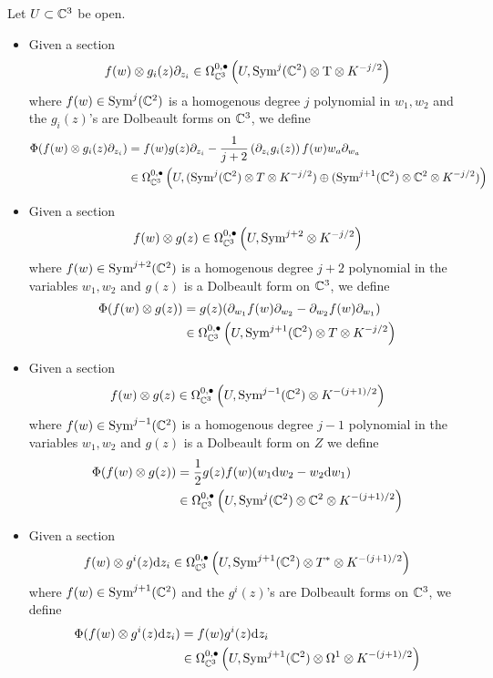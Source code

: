 Let $U\subset \mathbb{C}^3$ be open. 
\begin{itemize}
\item Given a section
\[
f(w) \otimes g_i(z) \partial_{z_i}\in \Omega^{0,\bullet}_{\mathbb{C}^3} \left (U, \text{Sym}^j(\mathbb{C}^2) \otimes {\mathrm{T}} \otimes K^{-j/2} \right )
\] where $f(w) \in \text{Sym}^j (\mathbb{C}^2)$ is a homogenous degree $j$ polynomial in $w_1,w_2$ and the $g_i(z)$'s are Dolbeault forms on $\mathbb{C}^3$, we define
\begin{align*}
\Phi(f(w) \otimes g_i(z) \partial_{z_i}) &= f(w) g(z) \partial_{z_i} - \frac{1}{j+2} \left(\partial_{z_i} g_i(z)\right) f(w) w_a\partial_{w_a} \\
&\in \Omega^{0,\bullet}_{\mathbb{C}^3} \left ( U, (\text{Sym}^j (\mathbb{C}^2) \otimes T\otimes K^{-j/2} )\oplus ( \text{Sym}^{j+1}(\mathbb{C}^2) \otimes \mathbb{C}^2 \otimes K^{-j/2} ) \right )
\end{align*}

\item Given a section
\[
f(w) \otimes g(z)\in \Omega^{0,\bullet}_{\mathbb{C}^3} \left (U, \text{Sym}^{j+2} \otimes K^{-j/2} \right)
\] where $f(w) \in \text{Sym}^{j+2} (\mathbb{C}^2)$ is a homogenous degree $j+2$ polynomial in the variables $w_1,w_2$ and $g(z)$ is a Dolbeault form on $\mathbb{C}^3$, we define
\begin{align*}
\Phi ( f(w) \otimes g(z) ) &= g(z) (\partial _{w_1} f(w) \partial_{w_2} - \partial _{w_2} f(w) \partial_{w_1} ) \\
&\in \Omega^{0,\bullet}_{\mathbb{C}^3} \left ( U, \text{Sym}^{j+1} (\mathbb{C}^2) \otimes T \otimes K^{-j/2}\right )
\end{align*}

\item Given a section
\[
f(w) \otimes g(z)  \in \Omega^{0,\bullet}_{\mathbb{C}^3} \left (U, \text{Sym}^{j-1}(\mathbb{C}^2) \otimes K^{-(j+1)/2} \right)
\]
where $f(w) \in \text{Sym}^{j-1} (\mathbb{C}^2)$ is a homogenous degree $j-1$ polynomial in the variables $w_1,w_2$ and $g(z)$ is a Dolbeault form on $Z$ we define
\begin{align*}
\Phi( f(w) \otimes g(z) ) &= \frac12 g(z)f(w)(w_1 \mathrm{d} w_2 - w_2 \mathrm{d} w_1)  \\
& \in \Omega^{0,\bullet}_{\mathbb{C}^3}\left  (U, \text{Sym}^j (\mathbb{C}^2) \otimes \mathbb{C}^2 \otimes K^{-(j+1)/2} \right )
\end{align*}

\item
Given a section
\[
f(w) \otimes g^i(z)  \mathrm{d} z_i\in \Omega^{0,\bullet}_{\mathbb{C}^3} \left (U, \text{Sym}^{j+1}(\mathbb{C}^2) \otimes T^* \otimes K^{-(j+1)/2} \right)
\] 
where $f(w) \in \text{Sym}^{j+1} (\mathbb{C}^2)$ and the $g^i(z)$'s are Dolbeault forms on $\mathbb{C}^3$, we define 
\begin{align*}
\Phi(f(w) \otimes g^i(z) \mathrm{d} z_i) & = f(w) g^i (z) \mathrm{d} z_i \\
& \in \Omega^{0,\bullet}_{\mathbb{C}^3} \left (U, \text{Sym}^{j+1} (\mathbb{C}^2) \otimes \Omega^1 \otimes K^{-(j+1)/2} \right )
\end{align*}
\end{itemize}

